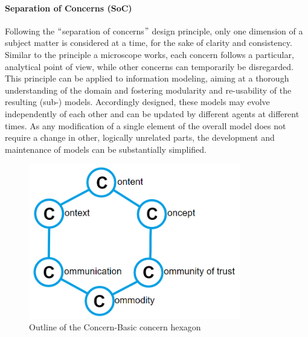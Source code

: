 \paragraph{Separation of Concerns (SoC)\\}
Following the $``$separation of concerns$"$  design principle, only one dimension of a subject matter is considered at a time, for the sake of clarity and consistency. Similar to the principle a microscope works, each concern follows a particular, analytical point of view, while other concerns can temporarily be disregarded. This principle can be applied to information modeling, aiming at a thorough understanding of the domain and fostering modularity and re-usability of the resulting (sub-) models. Accordingly designed, these models may evolve independently of each other and can be updated by different agents at different times. As any modification of a single element of the overall model does not require a change in other, logically unrelated parts, the development and maintenance of models can be substantially simplified. 



\begin{figure}[h]
	\begin{Center}
		\includegraphics[width=3.64in,height=2.67in]{./media/image32.png}
		\caption{Outline of the Concern-Basic concern hexagon}
		\label{fig:Outline_of_the_ConcernBasic_concern_hexagon}
	\end{Center}
\end{figure}



